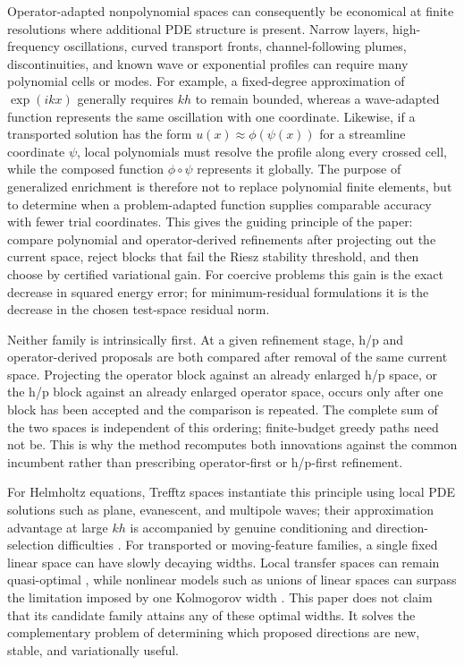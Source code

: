 \documentclass[11pt]{article}
\numberwithin{algorithm}{section}
\theoremstyle{definition}\newtheorem{definition}[theorem]{Definition}
\theoremstyle{remark}\newtheorem{remark}[theorem]{Remark}
\begin{document}
Operator-adapted nonpolynomial spaces can consequently be economical at finite
resolutions where additional PDE structure is present. Narrow layers,
high-frequency oscillations, curved transport
fronts, channel-following plumes, discontinuities, and known wave or
exponential profiles can require many polynomial cells or modes. For example,
a fixed-degree approximation of $\exp(ikx)$ generally requires $kh$ to remain
bounded, whereas a wave-adapted function represents the same oscillation with
one coordinate. Likewise, if a transported solution has the form
$u(x)\approx\phi(\psi(x))$ for a streamline coordinate $\psi$, local
polynomials must resolve the profile along every crossed cell, while the
composed function $\phi\circ\psi$ represents it globally. The purpose of
generalized enrichment is therefore not to replace polynomial finite elements,
but to determine when a problem-adapted function supplies comparable accuracy
with fewer trial coordinates.  This gives the guiding principle of the paper:
compare polynomial and operator-derived refinements after projecting out the
current space, reject blocks that fail the Riesz stability threshold, and then
choose by certified variational gain.  For coercive problems this gain is the
exact decrease in squared energy error; for minimum-residual formulations it
is the decrease in the chosen test-space residual norm.

Neither family is intrinsically first.  At a given refinement stage, h/p and
operator-derived proposals are both compared after removal of the same current
space.  Projecting the operator block against an already enlarged h/p space,
or the h/p block against an already enlarged operator space, occurs only after
one block has been accepted and the comparison is repeated.  The complete sum
of the two spaces is independent of this ordering; finite-budget greedy paths
need not be.  This is why the method recomputes both innovations against the
common incumbent rather than prescribing operator-first or h/p-first
refinement.

For Helmholtz equations, Trefftz spaces instantiate this principle using
local PDE solutions such as plane, evanescent, and multipole waves; their
approximation advantage at large $kh$ is accompanied by genuine conditioning
and direction-selection difficulties \cite{hiptmairmoiolaperugia2016}.  For
transported or moving-feature families, a single fixed linear space can have
slowly decaying widths.  Local transfer spaces can remain quasi-optimal
\cite{schleusssmetanatermaat2023}, while nonlinear models such as unions of
linear spaces can surpass the limitation imposed by one Kolmogorov width
\cite{cohendahmenmula2022}.  This paper does not claim that its
candidate family attains any of these optimal widths.  It solves the
complementary problem of determining which proposed directions are new,
stable, and variationally useful.
\end{document}
